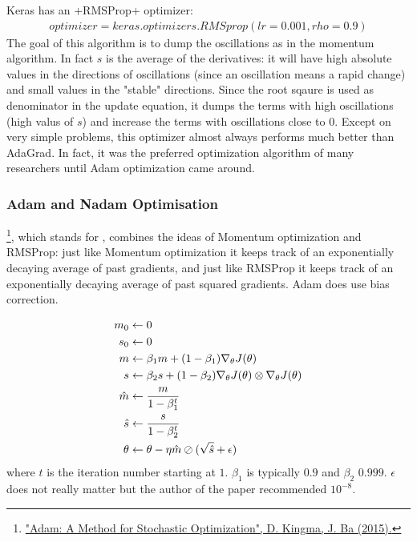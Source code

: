 Keras has an \cd+RMSProp+ optimizer:
\begin{equation}
\begin{aligned}
optimizer = keras.optimizers.RMSprop(lr=0.001, rho=0.9)
\end{aligned}
\end{equation}
The goal of this algorithm is to dump the oscillations as in the momentum algorithm. In fact $s$ is the average of the derivatives: it will have high absolute values in the directions of oscillations (since an oscillation means a rapid change) and small values in the "stable" directions. Since the root sqaure is used as denominator in the update equation, it dumps the terms with high oscillations (high valus of $s$) and increase the terms with oscillations close to $0$. Except on very simple problems, this optimizer almost always performs much better than AdaGrad. In fact, it was the preferred optimization algorithm of many researchers until Adam optimization came around.


\subsubsection{Adam and Nadam Optimisation}
\label{subsec:ADAM}
\footnote{\href{https://homl.info/59}{"Adam: A Method for Stochastic Optimization", D. Kingma, J. Ba (2015).}}, which stands for , combines the ideas of Momentum optimization and RMSProp: just like Momentum optimization it keeps track of an exponentially decaying average of past gradients, and just like RMSProp it keeps track of an exponentially decaying average of past squared gradients. Adam does use bias correction.

\begin{equation}
\begin{aligned}
m_0 &\leftarrow 0\\
s_0 &\leftarrow 0\\
m &\leftarrow \beta_1 m + \br{1-\beta_1} \nabla_\theta J(\theta)\\
s &\leftarrow \beta_2 s + (1-\beta_2) \nabla_\theta J(\theta) \otimes \nabla_\theta J(\theta)\\
\hat{m} &\leftarrow\frac{m}{1-\beta_1^t}\\
\hat{s} &\leftarrow\frac{s}{1-\beta_2^t}\\
\theta &\leftarrow \theta - \eta \hat{m} \oslash (\sqrt{\hat{s}}+\epsilon)
\end{aligned}
\label{eq:Adam}
\end{equation}
where $t$ is the iteration number starting at $1$. $\beta_1$ is typically $0.9$ and $\beta_2$ $0.999$. $\epsilon$ does not really matter but the author of the paper recommended $10^{-8}$.

